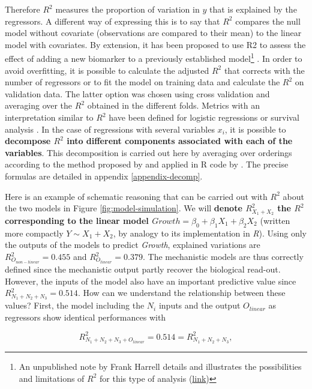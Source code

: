 \documentclass[a4paper,12pt,twoside,onecolumn,openright,final,oldfontcommands]{memoir}
\begin{document}
Therefore \(R^2\) measures the proportion of variation in \(y\) that is
explained by the regressors. A different way of expressing this is to
say that \(R^2\) compares the null model without covariate (observations
are compared to their mean) to the linear model with covariates. By
extension, it has been proposed to use R2 to assess the effect of adding
a new biomarker to a previously established model\footnote{An
  unpublished note by Frank Harrell details and illustrates the
  possibilities and limitations of \(R^2\) for this type of analysis
  (\href{https://www.fharrell.com/post/addvalue/}{link})}
\citep{schemper2003predictive}. In order to avoid overfitting, it is
possible to calculate the adjusted \(R^2\) that corrects with the number
of regressors or to fit the model on training data and calculate the
\(R^2\) on validation data. The latter option was chosen using cross
validation and averaging over the \(R^2\) obtained in the different
folds. Metrics with an interpretation similar to \(R^2\) have been
defined for logistic regressions or survival analysis
\citep{choodari2012simulation}. In the case of regressions with several
variables \(x_i\), it is possible to \textbf{decompose \(R^2\) into
different components associated with each of the variables}. This
decomposition is carried out here by averaging over orderings according
to the method proposed by \citet{lindeman1980introduction} and applied
in R code by \citet{gromping2006relative}. The precise formulas are
detailed in appendix \ref{appendix-decomp}.

Here is an example of schematic reasoning that can be carried out with
\(R^2\) about the two models in Figure \ref{fig:model-simulation}. We
will \textbf{denote \(R^2_{X_1+X_2}\) the \(R^2\) corresponding to the
linear model \(Growth=\beta_0+\beta_1 X_1+\beta_2 X_2\)} (written more
compactly \(Y\sim X_1+X_2\), by analogy to its implementation in
\emph{R}). Using only the outputs of the models to predict
\emph{Growth}, explained variations are \(R^2_{O_{non-linear}}=0.455\)
and \(R^2_{O_{linear}}=0.379\). The mechanistic models are thus
correctly defined since the mechanistic output partly recover the
biological read-out. However, the inputs of the model also have an
important predictive value since \(R^2_{N_1+N_2+N_3}=0.514\). How can we
understand the relationship between these values? First, the model
including the \(N_i\) inputs and the output \(O_{linear}\) as regressors
show identical performances with

\[R^2_{N_1+N_2+N_3+O_{linear}}=0.514=R^2_{N_1+N_2+N_3},\]
\end{document}
